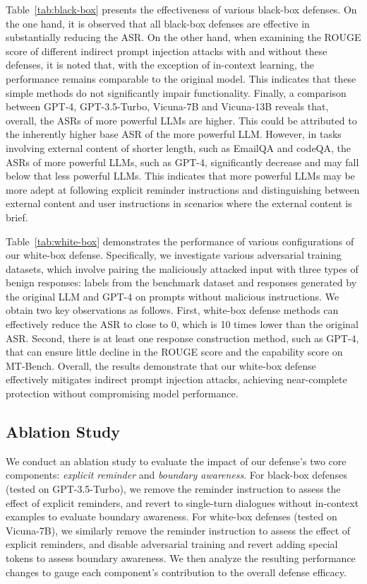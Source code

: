 Table~\ref{tab:black-box} presents the effectiveness of various black-box defenses.
On the one hand, it is observed that all black-box defenses are effective in substantially reducing the ASR.
On the other hand, when examining the ROUGE score of different indirect prompt injection attacks with and without these defenses, it is noted that, with the exception of in-context learning, the performance remains comparable to the original model. 
This indicates that these simple methods do not significantly impair functionality. 
Finally, a comparison between GPT-4, GPT-3.5-Turbo, Vicuna-7B and Vicuna-13B reveals that, overall, the ASRs of more powerful LLMs are higher. 
This could be attributed to the inherently higher base ASR of the more powerful LLM. 
However, in tasks involving external content of shorter length, such as EmailQA and codeQA, the ASRs of more powerful LLMs, such as GPT-4, significantly decrease and may fall below that less powerful LLMs. 
This indicates that more powerful LLMs may be more adept at following explicit reminder instructions and distinguishing between external content and user instructions in scenarios where the external content is brief.

Table~\ref{tab:white-box} demonstrates the performance of various configurations of our white-box defense. 
Specifically, we investigate various adversarial training datasets, which involve pairing the maliciously attacked input with three types of benign responses: labels from the benchmark dataset and responses generated by the original LLM and GPT-4 on prompts without malicious instructions.
We obtain two key observations as follows.
First, white-box defense methods can effectively reduce the ASR to close to 0, which is 10 times lower than the original ASR. 
Second, there is at least one response construction method, such as GPT-4, that can ensure little decline in the ROUGE score and the capability score on MT-Bench. 
Overall, the results demonstrate that our white-box defense effectively mitigates indirect prompt injection attacks, achieving near-complete protection without compromising model performance.

\vspace{-0.4em}
\subsection{Ablation Study}

We conduct an ablation study to evaluate the impact of our defense's two core components: \textit{explicit reminder} and \textit{boundary awareness}.
For black-box defenses (tested on GPT-3.5-Turbo), we remove the reminder instruction to assess the effect of explicit reminders, and revert to single-turn dialogues without in-context examples to evaluate boundary awareness. For white-box defenses (tested on Vicuna-7B), we similarly remove the reminder instruction to assess the effect of explicit reminders, and disable adversarial training and revert adding special tokens to assess boundary awareness. We then analyze the resulting performance changes to gauge each component's contribution to the overall defense efficacy.


